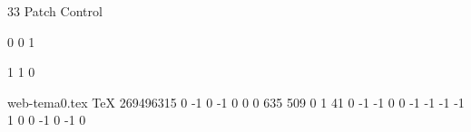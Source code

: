 33 Patch Control

0
0
1

1
1
0

web-tema0.tex
TeX
269496315 0 -1 0 -1 0 0 0 635 509 0 1 41 0 -1 -1 0 0 -1 -1 -1 -1 1 0 0 -1  0 -1 0

